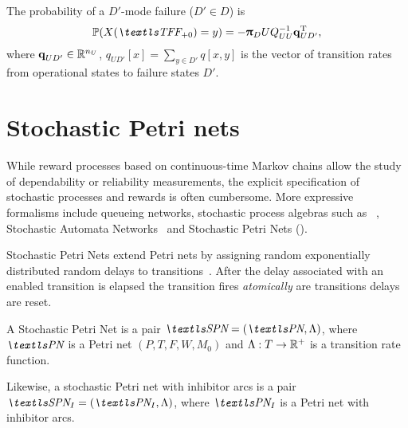 The probability of a $D'$-mode failure ($D' \in D$) is
\begin{equation}
  \label{eq:background:failure-mode}
  \Pr(X(\TFF_{+ 0}) = y) = - \vec{\uppi}_DUQ_{UU}^{-1} \vec{q}_{UD'}^\T \text,
\end{equation}
where $\bm{\mathrm{q}}_{UD'} \in \mathbb{R}^{n_U}$,
$q_{UD'}[x] = \sum_{y \in D'} q[x, y]$ is the vector of transition
rates from operational states to failure states $D'$.

\section{Stochastic Petri nets}

While reward processes based on continuous-time Markov chains allow
the study of dependability or reliability measurements, the explicit
specification of stochastic processes and rewards is often
cumbersome. More expressive formalisms include queueing networks,
stochastic process algebras such as
~\citep{DBLP:conf/cpe/GilmoreH94,donatelli1993superposed},
Stochastic Automata Networks~\citep{DBLP:conf/mascots/FernandesPS95}
and Stochastic Petri Nets ().

Stochastic Petri Nets extend Petri nets by assigning random
exponentially distributed random delays to
transitions~\citep{DBLP:conf/apn/Marsan88}. After the delay associated
with an enabled transition is elapsed the transition fires
\emph{atomically} are transitions delays are reset.

\begin{dfn}
  A Stochastic Petri Net is a pair $\SPN = (\PN, \Lambda)$, where
  $\PN$ is a Petri net $(P, T, F, W, M_0)$ and $\Lambda: T \to \mathbb{R}^{+}$
  is a transition rate function.

  Likewise, a stochastic Petri net with inhibitor arcs is a pair
  $\SPN_I = (\PN_I, \Lambda)$, where $\PN_I$ is a Petri net with
  inhibitor arcs.
\end{dfn}

\needspace{5ex}

